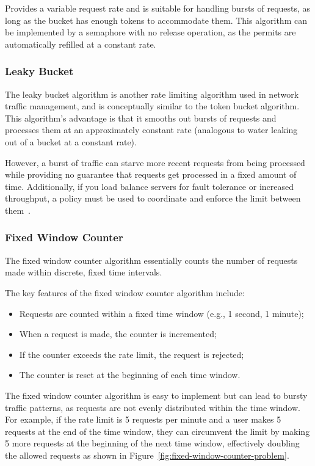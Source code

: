 Provides a variable request rate and is suitable for handling bursts of requests,
as long as the bucket has enough tokens to accommodate them.
This algorithm can be implemented by a semaphore with no release operation, as the permits are automatically refilled at a constant rate.

\subsubsection{Leaky Bucket}\label{subsubsec:leaky-bucket-algorithm}

The leaky bucket algorithm is another rate limiting algorithm used in network traffic management, and is conceptually similar to the token bucket algorithm.
This algorithm's advantage is that it smooths out bursts of requests
and processes them at an approximately constant rate (analogous to water leaking out of a bucket at a constant rate).

However,
a burst of traffic can starve more recent requests from being processed
while providing no guarantee that requests get processed in a fixed amount of time.
Additionally, if you load balance servers for fault tolerance or increased throughput, a policy must be used to coordinate and enforce the limit between them~\cite{kong-rate-limiting}.

\subsubsection{Fixed Window Counter}\label{subsubsec:fixed-window-counter-algorithm}

The fixed window counter algorithm essentially counts the number of requests made within discrete,
fixed time intervals.

The key features of the fixed window counter algorithm include:

\begin{itemize}
    \item Requests are counted within a fixed time window (e.g., 1 second, 1 minute);
    \item When a request is made, the counter is incremented;
    \item If the counter exceeds the rate limit, the request is rejected;
    \item The counter is reset at the beginning of each time window.
\end{itemize}

The fixed window counter algorithm is easy to implement but can lead to bursty traffic patterns, as requests are not evenly distributed within the time window.
For example, if the rate limit is 5 requests per minute and a user makes 5 requests at the end of the time window, they can circumvent the limit by making 5 more requests at the beginning of the next time window, effectively doubling the allowed requests as shown in Figure~\ref{fig:fixed-window-counter-problem}.

